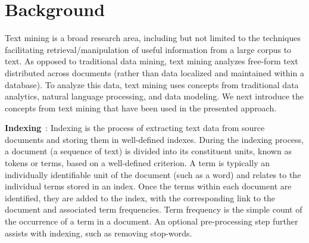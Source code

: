 \vspace*{-1ex}
\section{Background}
\label{sec:background}
\vspace*{-1ex}

Text mining is a broad research area, 
including but not limited to the techniques 
facilitating retrieval/manipulation of useful information from a large corpus to text. 
As opposed to traditional data mining, text mining analyzes
free-form text distributed across documents
(rather than data localized and maintained within a database).
To analyze this data, text mining uses concepts from traditional
data analytics, natural language processing, and data modeling.
We next introduce the concepts from text mining that have been used in the presented approach.


\textbf{Indexing}~\cite{frakes1992introduction,manning2008introduction}:
Indexing is the process of extracting text data from source documents
and storing them in well-defined indexes.
During the indexing process, a document (a sequence of text) is divided into its constituent units, known as tokens or terms, based on a well-defined criterion. 
A term is typically an individually identifiable unit of the document (such as a word) and relates to the individual terms stored in an index. Once the terms within each document are identified, they are added to the index, with the corresponding link to the document and associated term frequencies.
Term frequency is the simple count of the occurrence of a term in a document.
An optional pre-processing step further assists with indexing, such as removing stop-words. 


